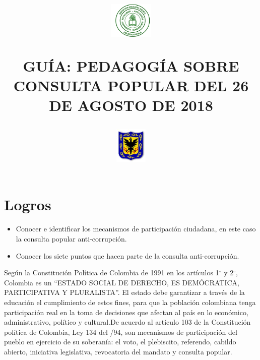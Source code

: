 \documentclass[twoside]{article}
\title{\begin{minipage}{.2\textwidth}
\includegraphics[height=1.75cm]{Images/logo-colegio.png}\end{minipage}
\begin{minipage}{.55\textwidth}
\begin{center}
GUÍA: PEDAGOGÍA SOBRE CONSULTA POPULAR DEL 26 DE AGOSTO DE 2018\\
\end{center}
\end{minipage}\hfill
\begin{minipage}{.2\textwidth}
\includegraphics[height=1.75cm]{Images/logo-sed.png} 
\end{minipage}}
\date{}
\begin{document}
\maketitle
\vspace{-.7in}
\section*{Logros}
\begin{itemize}
\item Conocer e identificar  los mecanismos de participación ciudadana, en este caso la consulta popular anti-corrupción.
\item Conocer los siete puntos  que hacen parte de la consulta anti-corrupción. 
\end{itemize}
Según la Constitución Política de Colombia de 1991 en los artículos 1$^\circ$ y 2$^\circ$, Colombia es un “ESTADO SOCIAL DE DERECHO, ES DEMÓCRATICA, PARTICIPATIVA Y PLURALISTA”. El estado debe garantizar a través de la educación el cumplimiento de estos fines, para que la población colombiana tenga participación real en la toma de decisiones que afectan al país en lo económico, administrativo, político y cultural.De acuerdo al artículo 103 de la Constitución política de Colombia, Ley 134 del /94, son mecanismos de participación del pueblo en ejercicio de su soberanía: el voto, el plebiscito, referendo, cabildo abierto, iniciativa legislativa, revocatoria del mandato y consulta popular.
\end{document}
